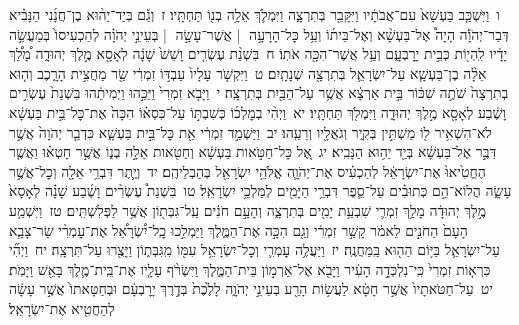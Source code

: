 \documentclass[18pt]{article}
\begin{document}
 {\loc ו~}וַיִּשְׁכַּ֤ב בַּעְשָׁא֙ עִם־אֲבֹתָ֔יו וַיִּקָּבֵ֖ר בְּתִרְצָ֑ה וַיִּמְלֹ֛ךְ אֵלָ֥ה בְנ֖וֹ תַּחְתָּֽיו׃ \startlock
 {\loc ז~}וְגַ֡ם בְּיַד־יֵה֨וּא בֶן־חֲנָ֜נִי הַנָּבִ֗יא דְּבַר־יְהֹוָ֡ה הָיָה֩ אֶל־בַּעְשָׁ֨א וְאֶל־בֵּית֜וֹ וְעַ֥ל כׇּל־הָרָעָ֣ה  |  אֲשֶׁר־עָשָׂ֣ה  |  בְּעֵינֵ֣י יְהֹוָ֗ה לְהַכְעִיסוֹ֙ בְּמַעֲשֵׂ֣ה יָדָ֔יו לִֽהְי֖וֹת כְּבֵ֣ית יָרׇבְעָ֑ם וְעַ֥ל אֲשֶׁר־הִכָּ֖ה אֹתֽוֹ׃ \startlock
 {\loc ח~}בִּשְׁנַ֨ת עֶשְׂרִ֤ים וָשֵׁשׁ֙ שָׁנָ֔ה לְאָסָ֖א מֶ֣לֶךְ יְהוּדָ֑ה מָ֠לַ֠ךְ אֵלָ֨ה בֶן־בַּעְשָׁ֧א עַל־יִשְׂרָאֵ֛ל בְּתִרְצָ֖ה שְׁנָתָֽיִם׃ \startlock
 {\loc ט~}וַיִּקְשֹׁ֤ר עָלָיו֙ עַבְדּ֣וֹ זִמְרִ֔י שַׂ֖ר מַחֲצִ֣ית הָרָ֑כֶב וְה֤וּא בְתִרְצָה֙ שֹׁתֶ֣ה שִׁכּ֔וֹר בֵּ֣ית אַרְצָ֔א אֲשֶׁ֥ר עַל־הַבַּ֖יִת בְּתִרְצָֽה׃ \startlock
 {\loc י~}וַיָּבֹ֤א זִמְרִי֙ וַיַּכֵּ֣הוּ וַיְמִיתֵ֔הוּ בִּשְׁנַת֙ עֶשְׂרִ֣ים וָשֶׁ֔בַע לְאָסָ֖א מֶ֣לֶךְ יְהוּדָ֑ה וַיִּמְלֹ֖ךְ תַּחְתָּֽיו׃ \startlock
 {\loc יא~}וַיְהִ֨י בְמׇלְכ֜וֹ כְּשִׁבְתּ֣וֹ עַל־כִּסְא֗וֹ הִכָּה֙ אֶת־כׇּל־בֵּ֣ית בַּעְשָׁ֔א לֹא־הִשְׁאִ֥יר ל֖וֹ מַשְׁתִּ֣ין בְּקִ֑יר וְגֹאֲלָ֖יו וְרֵעֵֽהוּ׃ \startlock
 {\loc יב~}וַיַּשְׁמֵ֣ד זִמְרִ֔י אֵ֖ת כׇּל־בֵּ֣ית בַּעְשָׁ֑א כִּדְבַ֤ר יְהֹוָה֙ אֲשֶׁ֣ר דִּבֶּ֣ר אֶל־בַּעְשָׁ֔א בְּיַ֖ד יֵה֥וּא הַנָּבִֽיא׃ \startlock
 {\loc יג~}אֶ֚ל כׇּל־חַטֹּ֣אות בַּעְשָׁ֔א וְחַטֹּ֖אות אֵלָ֣ה בְנ֑וֹ אֲשֶׁ֣ר חָטְא֗וּ וַאֲשֶׁ֤ר הֶחֱטִ֙יאוּ֙ אֶת־יִשְׂרָאֵ֔ל לְהַכְעִ֗יס אֶת־יְהֹוָ֛ה אֱלֹהֵ֥י יִשְׂרָאֵ֖ל בְּהַבְלֵיהֶֽם׃ \startlock
 {\loc יד~}וְיֶ֛תֶר דִּבְרֵ֥י אֵלָ֖ה וְכׇל־אֲשֶׁ֣ר עָשָׂ֑ה הֲלוֹא־הֵ֣ם כְּתוּבִ֗ים עַל־סֵ֛פֶר דִּבְרֵ֥י הַיָּמִ֖ים לְמַלְכֵ֥י יִשְׂרָאֵֽל׃ \startlock
 {\loc טו~}בִּשְׁנַת֩ עֶשְׂרִ֨ים וָשֶׁ֜בַע שָׁנָ֗ה לְאָסָא֙ מֶ֣לֶךְ יְהוּדָ֔ה מָלַ֥ךְ זִמְרִ֛י שִׁבְעַ֥ת יָמִ֖ים בְּתִרְצָ֑ה וְהָעָ֣ם חֹנִ֔ים עַֽל־גִּבְּת֖וֹן אֲשֶׁ֥ר לַפְּלִשְׁתִּֽים׃ \startlock
 {\loc טז~}וַיִּשְׁמַ֤ע הָעָם֙ הַחֹנִ֣ים לֵאמֹ֔ר קָשַׁ֣ר זִמְרִ֔י וְגַ֖ם הִכָּ֣ה אֶת־הַמֶּ֑לֶךְ וַיַּמְלִ֣כוּ כׇֽל־יִ֠שְׂרָאֵ֠ל אֶת־עׇמְרִ֨י שַׂר־צָבָ֧א עַל־יִשְׂרָאֵ֛ל בַּיּ֥וֹם הַה֖וּא בַּֽמַּחֲנֶֽה׃ \startlock
 {\loc יז~}וַיַּעֲלֶ֥ה עׇמְרִ֛י וְכׇל־יִשְׂרָאֵ֥ל עִמּ֖וֹ מִֽגִּבְּת֑וֹן וַיָּצֻ֖רוּ עַל־תִּרְצָֽה׃ \startlock
 {\loc יח~}וַיְהִ֞י כִּרְא֤וֹת זִמְרִי֙ כִּֽי־נִלְכְּדָ֣ה הָעִ֔יר וַיָּבֹ֖א אֶל־אַרְמ֣וֹן בֵּית־הַמֶּ֑לֶךְ וַיִּשְׂרֹ֨ף עָלָ֧יו אֶת־בֵּֽית־מֶ֛לֶךְ בָּאֵ֖שׁ וַיָּמֹֽת׃ \startlock
 {\loc יט~}עַל־חַטֹּאתָיו֙ אֲשֶׁ֣ר חָטָ֔א לַעֲשׂ֥וֹת הָרַ֖ע בְּעֵינֵ֣י יְהֹוָ֑ה לָלֶ֙כֶת֙ בְּדֶ֣רֶךְ יָרׇבְעָ֔ם וּבְחַטָּאתוֹ֙ אֲשֶׁ֣ר עָשָׂ֔ה לְהַחֲטִ֖יא אֶת־יִשְׂרָאֵֽל׃ \startlock
\end{document}
